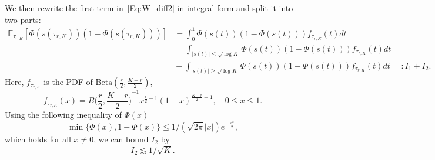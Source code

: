 \documentclass[%
onefignum,onetabnum]{siamonline250211}
\newcommand{\bbE}{\mathbb E}
\begin{document}
We then rewrite the first term in~\eqref{Eq:W_diff2} in integral form and split it into two parts:
\begin{equation*}
    \begin{aligned}
        \bbE_{\tau_{r,K}}\left[ \Phi \left( s(\tau_{r,K}) \right)\left( 1-\Phi \left( s(\tau_{r,K}) \right) \right) \right] &= \int_0^1 \Phi \left( s(t) \right)\left( 1-\Phi \left( s(t) \right) \right) f_{\tau_{r,K}}(t)dt \\
        &= \int_{|s(t)|\leq \sqrt{\log{K}}} \Phi \left( s(t) \right)\left( 1-\Phi \left( s(t) \right) \right) f_{\tau_{r,K}}(t)dt \\
        &\!\!\!\! + \int_{|s(t)|\geq \sqrt{\log{K}}} \Phi \left( s(t) \right)\left( 1-\Phi \left( s(t) \right) \right) f_{\tau_{r,K}}(t)dt
        =: I_1+I_2.
    \end{aligned}
\end{equation*}
Here, $f_{\tau_{r,K}}$ is the PDF of $\mathrm{Beta} \left( \frac{r}{2},\frac{K-r}{2} \right)$,
\begin{equation*}
    f_{\tau_{r,K}}(x)={B\Big( \frac{r}{2},\frac{K-r}{2} \Big)}^{-1}x^{\frac{r}{2}-1}(1-x)^{\frac{K-r}{2}-1},\quad 0\leq x\leq 1.
\end{equation*}
%
Using the following inequality of $\Phi(x)$
\begin{equation}\label{Eq:asy_Phi}
    \min{\{\Phi(x), 1-\Phi(x)\}}\leq {1}/{(\sqrt{2\pi}|x|)}e^{-\frac{x^2}{2}},
\end{equation}
which holds for all $x\neq 0$, we can bound $I_2$ by
\begin{equation}\label{Eq:bd_I2}
    I_2\lesssim {1}/{\sqrt{K}}.
\end{equation}
\end{document}
